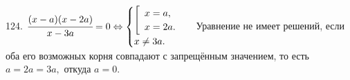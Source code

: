 124. $\cfrac{(x-a)(x-2a)}{x-3a}=0\Leftrightarrow \begin{cases} \left[\begin{array}{l} x=a,\\ x=2a.\end{array}\right.\\ x\neq 3a.\end{cases}$ Уравнение не имеет решений, если оба его возможных корня совпадают с запрещённым значением, то есть $a=2a=3a,$ откуда $a=0.$\\
